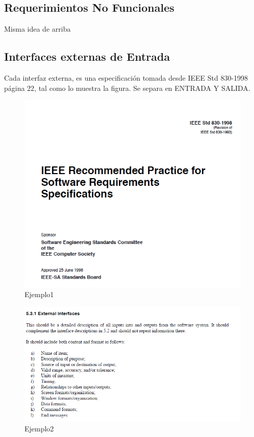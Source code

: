 \subsection{Requerimientos No Funcionales}

Misma idea de arriba

\subsection{Interfaces externas de Entrada}

Cada interfaz externa, es una especificación tomada desde IEEE Std 830-1998 página 22, tal como lo muestra la figura. Se separa en ENTRADA Y SALIDA.

\begin{figure}[H]
    \centering
    \includegraphics[scale=0.5]{figures/i1.png}
    \caption{Ejemplo1}
    \label{fig:e1}
\end{figure}

\begin{figure}[H]
    \centering
    \includegraphics[scale=0.5]{figures/i2.png}
    \caption{Ejemplo2}
    \label{fig:e2}
\end{figure}

